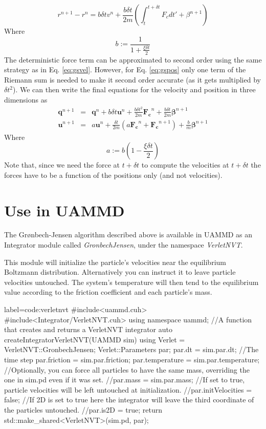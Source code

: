 \documentclass[twoside,openright,titlepage,numbers=noenddot,%
headinclude,footinclude,cleardoublepage=empty,abstract=on,
BCOR=5mm,fontsize=11pt, dvipsnames, paper=b5
]{scrreprt}
\renewcommand{\vec}[1]{\bm{#1}}
\newcommand{\uammd}{\gls{UAMMD}\xspace}
\newcommand{\dt}{\delta t}
\newcommand{\ppos}{q}
\newcommand{\pvel}{u}
\begin{document}
\begin{equation}
  \label{eq:gspos}
  r^{n+1} - r^n =  b \dt v^n + \frac{b\dt}{2m}\left(\int_t^{t+\dt}F_cdt' + \beta^{n+1}\right)
\end{equation}
Where
\begin{equation}
b := \frac{1}{1+\frac{\xi\dt}{2}}
\end{equation}
The deterministic force term can be approximated to second order using the same strategy as in Eq. \eqref{eq:gsvel}. However, for Eq. \eqref{eq:gspos} only one term of the Riemann sum is needed to make it second order accurate (as it gets multiplied by $\dt^2$). We can then write the final equations for the velocity and position in three dimensions as
\begin{eqnarray}
  \label{eq:gsfinal}
  \vec{\ppos}^{n+1}  &=&  \vec{\ppos}^n + b \dt \vec{\pvel}^n + \frac{b\dt^2}{2m}\vec{F_c}^n + \frac{b\dt}{2m}\vec{\beta}^{n+1}\\
  \vec{\pvel}^{n+1} &=& a\vec{\pvel}^n + \frac{\dt}{2m}\left(a\vec{F_c}^n + \vec{F_c} ^{n+1}\right) +  \frac{b}{m}\vec{\beta}^{n+1}
\end{eqnarray}
Where
\begin{equation}
  a:=b \left(1-\frac{\xi\dt}{2}\right)
\end{equation}
Note that, since we need the force at $t+\dt$ to compute the velocities at $t+\dt$ the forces have to be a function of the positions only (and not velocities).

\section*{Use in UAMMD}
The Grønbech-Jensen algorithm described above is available in \uammd as an Integrator module called \emph{GronbechJensen}, under the namespace \emph{VerletNVT}.

This module will initialize the particle's velocities near the equilibrium Boltzmann distribution.
Alternatively you can instruct it to leave particle velocities untouched. The system's temperature will then tend to the equilibrium value according to the friction coefficient and each particle's mass.

\begin{code2}{label=code:verletnvt}
#include<uammd.cuh>
#include<Integrator/VerletNVT.cuh>
using namespace uammd;
//A function that creates and returns a VerletNVT integrator
auto createIntegratorVerletNVT(UAMMD sim){
  using Verlet = VerletNVT::GronbechJensen;
  Verlet::Parameters par;
  par.dt = sim.par.dt; //The time step
  par.friction = sim.par.friction;
  par.temperature = sim.par.temperature; 
  //Optionally, you can force all particles to have the same mass, overriding the one in sim.pd even if it was set.
  //par.mass = sim.par.mass;
  //If set to true, particle velocities will be left untouched at initialization.
  //par.initVelocities = false;
  //If 2D is set to true here the integrator will leave the third coordinate of the particles untouched.
  //par.is2D = true;
  return std::make_shared<VerletNVT>(sim.pd, par);
}
\end{code2}
\end{document}
